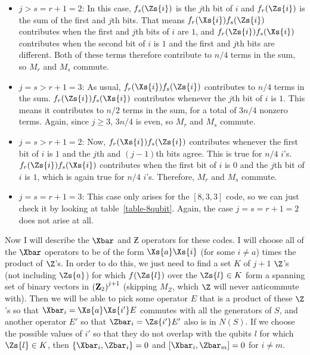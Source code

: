 \begin{itemize}
	\item $j > s = r+1 = 2$: In this case, $f_s (\Zs{i})$ is the $j$th bit of $i$
	and $f_r (\Zs{i})$ is the sum of the first and $j$th bits.  That means $f_r
	(\Xs{i}) f_s (\Zs{i})$ contributes when the first and $j$th bits of $i$ are $1$,
	and $f_r (\Zs{i}) f_s (\Xs{i})$ contributes when the second bit of $i$ is $1$
	and the first and $j$th bits are different.  Both of these terms therefore
	contribute to $n/4$ terms in the sum, so $M_r$ and $M_s$ commute.

	\item $j = s > r+1 = 3$: As usual, $f_r (\Xs{i}) f_s (\Zs{i})$ contributes to
	$n/4$ terms in the sum.  $f_r (\Zs{i}) f_s (\Xs{i})$ contributes whenever the
	$j$th bit of $i$ is $1$.  This means it contributes to $n/2$ terms in the sum,
	for a total of $3n/4$ nonzero terms.  Again, since $j \geq 3$, $3n/4$ is even,
	so $M_r$ and $M_s$ commute.

	\item $j = s > r+1 = 2$: Now, $f_r (\Xs{i}) f_s (\Zs{i})$ contributes whenever
	the first bit of $i$ is $1$ and the $j$th and $(j-1)$th bits agree.  This is
	true for $n/4$ $i$'s. $f_r (\Zs{i}) f_s (\Xs{i})$ contributes when the first
	bit of $i$ is 0 and the $j$th bit of $i$ is $1$, which is again true for $n/4$
	$i$'s.  Therefore, $M_r$ and $M_s$ commute.

	\item $j = s = r+1 = 3$: This case only arises for the $[8, 3, 3]$ code, so we
	can just check it by looking at table~\ref{table-8qubit}.  Again, the case
	$j = s = r+1 = 2$ does not arise at all.

\end{itemize}

Now I will describe the $\Xbar$ and $\Zbar$ operators for these codes.  I
will choose all of the $\Xbar$ operators to be of the form $\Xs{a} \Xs{i}$ (for
some $i \neq a$) times the product of $\Z$'s.  In order to do this, we just
need to find a set $K$ of $j+1$ $\Z$'s (not including $\Zs{a}$) for which
$f(\Zs{l})$ over the $\Zs{l} \in K$ form a spanning set of binary vectors in
$\left({\bf Z}_2 \right)^{j+1}$ (skipping $M_Z$, which $\Z$ will never
anticommute with).  Then we will be able to pick some operator $E$ that is
a product of these $\Z$'s so that $\Xbar_i = \Xs{a} \Xs{i'} E$ commutes with
all the generators of $S$, and another operator $E'$ so that $\Zbar_i =
\Zs{i'} E'$ also is in $N(S)$. If we choose the possible values of $i'$ so that
they do not overlap with the qubits $l$ for which $\Zs{l} \in K$, then $\{
\Xbar_i, \Zbar_i \} = 0$ and $[\Xbar_i, \Zbar_m] = 0$ for $i \neq m$.

